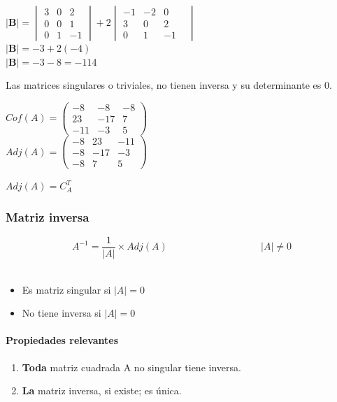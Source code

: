 \documentclass[stu, 12pt, letterpaper, donotrepeattitle, floatsintext, natbib]{apa7}
\begin{document}
\begin{itemize}
$\textbf{|B|}= \begin{vmatrix} 3 & 0 & 2 \\ 0 & 0 & 1 \\ 0 & 1 & -1 \end{vmatrix}
+
2 \begin{vmatrix} -1 & -2 & 0 & \\ 3 & 0 & 2 \\ 0 & 1 & -1 \end{vmatrix}
$\\[0.5cm]
$\textbf{|B|} = -3 + 2(-4)$\\[0.5cm]
$\textbf{|B|} = -3-8 = -11 $4
\end{itemize}

Las matrices singulares o triviales, no tienen inversa y su determinante es 0.\\[0.5cm]
\begin{paracol}{2}
$
{Cof}(A)= \begin{pmatrix} -8 & -8 & -8 \\ 23 & -17 & 7 \\ -11 & -3 & 5 \end{pmatrix}$\\
\vspace{0.5cm}
$
{Adj}(A)=\begin{pmatrix} -8 & 23 & -11 \\ -8 & -17 & -3 \\ -8 & 7 & 5 \end{pmatrix}
$

\switchcolumn
${Adj}(A)=C_A^T$
\end{paracol}

\subsubsection{Matriz inversa}
$$A^{-1}=\frac{1}{|A|} \times {Adj}(A) \hspace{4cm} |A|\neq 0 $$\\[0.5cm]
\begin{itemize}
\item Es matriz singular si $|A|=0$
\item No tiene inversa si $|A|=0$
\end{itemize}

\paragraph{Propiedades relevantes}
\begin{enumerate}
\item \textbf{Toda} matriz cuadrada A no singular tiene inversa.
\item \textbf{La} matriz inversa, si existe; es única.
\end{enumerate}
\end{document}
